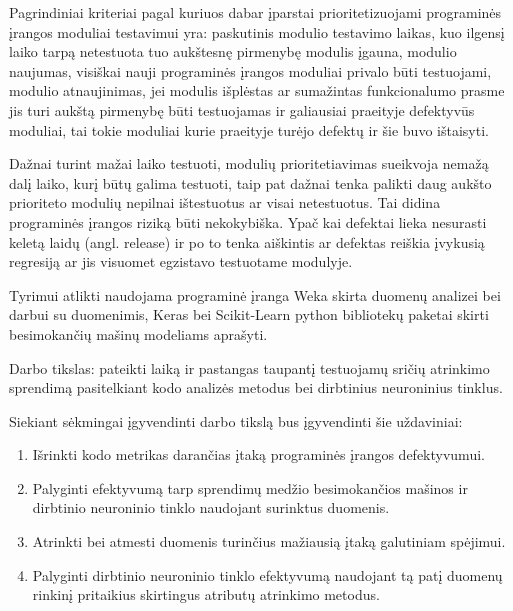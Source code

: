 \documentclass{VUMIFPSbakalaurinis}
\begin{document}
Pagrindiniai kriteriai pagal kuriuos dabar įparstai prioritetizuojami programinės įrangos moduliai testavimui yra: paskutinis modulio testavimo laikas, kuo ilgensį laiko tarpą netestuota tuo aukštesnę pirmenybę modulis įgauna, modulio naujumas, visiškai nauji programinės įrangos moduliai privalo būti testuojami, modulio atnaujinimas, jei modulis išplėstas ar sumažintas funkcionalumo prasme jis turi aukštą pirmenybę būti testuojamas ir galiausiai praeityje defektyvūs moduliai, tai tokie moduliai kurie praeityje turėjo defektų ir šie buvo ištaisyti.

Dažnai turint mažai laiko testuoti, modulių prioritetiavimas sueikvoja nemažą dalį laiko, kurį būtų galima testuoti, taip pat dažnai tenka palikti daug aukšto prioriteto modulių nepilnai ištestuotus ar visai netestuotus. Tai didina programinės įrangos riziką būti nekokybiška. Ypač kai defektai lieka nesurasti keletą laidų (angl. release) ir po to tenka aiškintis ar defektas reiškia įvykusią regresiją ar jis visuomet egzistavo testuotame modulyje.

Tyrimui atlikti naudojama programinė įranga Weka skirta duomenų analizei bei darbui su duomenimis, Keras bei Scikit-Learn python bibliotekų paketai skirti besimokančių mašinų modeliams aprašyti.

Darbo tikslas: pateikti laiką ir pastangas taupantį testuojamų sričių atrinkimo sprendimą pasitelkiant kodo analizės metodus bei dirbtinius neuroninius tinklus.

Siekiant sėkmingai įgyvendinti darbo tikslą bus įgyvendinti šie uždaviniai:
\begin{enumerate}
\item Išrinkti kodo metrikas darančias įtaką programinės įrangos defektyvumui.
\item Palyginti efektyvumą tarp sprendimų medžio besimokančios mašinos ir dirbtinio neuroninio tinklo naudojant surinktus duomenis.
\item Atrinkti bei atmesti duomenis turinčius mažiausią įtaką galutiniam spėjimui.
\item Palyginti dirbtinio neuroninio tinklo efektyvumą naudojant tą patį duomenų rinkinį pritaikius skirtingus atributų atrinkimo metodus.
\end{enumerate}
\end{document}

